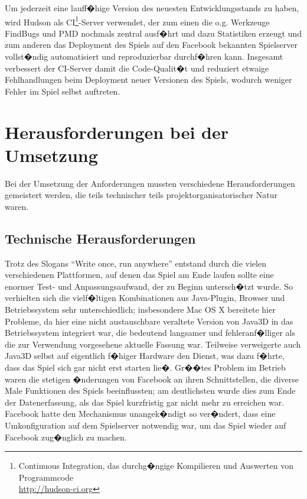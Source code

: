 \documentclass[a4paper,12pt]{scrartcl}
\begin{document}
Um jederzeit eine lauff�hige Version des neuesten Entwicklungsstands zu haben, wird
Hudson als CI\footnote{Continuous Integration, das durchg�ngige Kompilieren und Auswerten von Programmcode\\ \url{http://hudson-ci.org}}-Server verwendet, der zum einen die o.g. Werkzeuge FindBugs
und PMD nochmals zentral ausf�hrt und dazu Statistiken erzeugt und zum anderen das
Deployment des Spiels auf den Facebook bekannten Spielserver vollst�ndig automatisiert
und reproduzierbar durchf�hren kann. Insgesamt verbessert der CI-Server damit die
Code-Qualit�t und reduziert etwaige Fehlhandlungen beim Deployment neuer Versionen des
Spiels, wodurch weniger Fehler im Spiel selbst auftreten.

\section{Herausforderungen bei der Umsetzung}

Bei der Umsetzung der Anforderungen mussten verschiedene Herausforderungen
gemeistert werden, die teils technischer teils projektorganisatorischer Natur
waren.

\subsection{Technische Herausforderungen}

Trotz des Slogans ``Write once, run anywhere'' entstand durch die vielen verschiedenen Plattformen, auf denen das Spiel am Ende laufen sollte eine enormer Test- und Anpassungsaufwand, der zu Beginn untersch�tzt wurde. So verhielten sich die vielf�ltigen Kombinationen aus Java-Plugin, Browser und Betriebssystem sehr unterschiedlich; insbesondere Mac OS X bereitete hier Probleme, da hier eine nicht austauschbare veraltete Version von Java3D in das Betriebssystem integriert war, die bedeutend langsamer und fehleranf�lliger als die zur Verwendung vorgesehene aktuelle Fassung war. Teilweise verweigerte auch Java3D selbst auf eigentlich f�higer Hardware den Dienst, was dazu f�hrte, dass das Spiel sich gar nicht erst starten lie�. Gr��tes Problem im Betrieb waren die stetigen �nderungen von Facebook an ihren Schnittstellen, die  diverse Male Funktionen des Spiels beeinflussten; am deutlichsten wurde dies zum Ende der Datenerfassung, als das Spiel kurzfristig gar nicht mehr zu erreichen war. Facebook hatte den Mechanismus unangek�ndigt so ver�ndert, dass eine Umkonfiguration auf dem Spielserver notwendig war, um das Spiel wieder auf Facebook zug�nglich zu machen.
\end{document}
